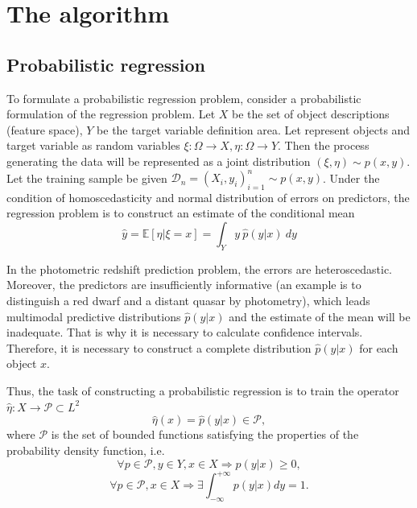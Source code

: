 \documentclass[fleqn,usenatbib]{mnras}
\begin{document}

\section{The algorithm}\label{sec:thealgorithm}

\subsection{Probabilistic regression}
To formulate a probabilistic regression problem, consider a probabilistic formulation of the regression problem. Let \(X\) be the set of object descriptions (feature space), \(Y\) be the target variable definition area. Let represent objects and target variable as random variables \(\xi : \Omega \rightarrow X, \eta : \Omega \rightarrow Y \). Then the process generating the data will be represented as a joint distribution \((\xi, \eta) \sim p(x, y)\). Let the training sample be given \(\mathcal{D}_n = (X_i, y_i)_{i=1}^n \sim p(x,y)\). Under the condition of homoscedasticity and normal distribution of errors on predictors, the regression problem is to construct an estimate of the conditional mean
\begin{equation}\label{eq:regr_classic}
     \hat{y} = \mathbb{E}[\eta | \xi = x] = \int_Y y ~ \hat{p}(y|x) ~ dy
\end{equation}

In the photometric redshift prediction problem, the errors are heteroscedastic. Moreover, the predictors are insufficiently informative (an example is to distinguish a red dwarf and a distant quasar by photometry), which leads multimodal predictive distributions $\hat{p}(y|x)$ and the estimate of the mean will be inadequate. That is why it is necessary to calculate confidence intervals. Therefore, it is necessary to construct a complete distribution $\hat{p}(y|x)$ for each object $x$.

Thus, the task of constructing a probabilistic regression is to train the operator \(\hat{\eta} : X \rightarrow \mathcal{P} \subset L^2\)
\begin{equation}
    \hat{\eta}(x) = \hat{p}(y|x) \in \mathcal{P},
\end{equation}
where \(\mathcal{P}\) is the set of bounded functions satisfying the properties of the probability density function, i.e.
\begin{equation}
    \forall p \in \mathcal{P}, y \in Y, x \in X \Rightarrow p(y|x) \geq 0,
\end{equation}
\begin{equation}
    \forall p \in \mathcal{P}, x \in X \Rightarrow \exists \int_{-\infty}^{+\infty} p(y|x) dy = 1.
\end{equation}
\end{document}
